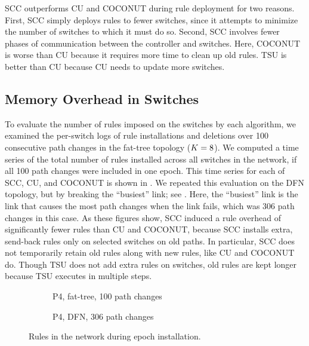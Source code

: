 SCC outperforms CU and COCONUT during rule deployment for two reasons.
First, SCC simply deploys rules to fewer switches, since it attempts
to minimize the number of switches to which it must do so.  Second,
SCC involves fewer phases of communication between the controller and
switches.  Here, COCONUT is worse than CU because it requires more
time to clean up old rules.  TSU is better than CU because CU needs to
update more switches.

\subsection{Memory Overhead in Switches}
\label{sec:eval:rules}

To evaluate the number of rules imposed on the switches by each
algorithm, we examined the per-switch logs of rule installations and
deletions over 100 consecutive path changes in the fat-tree topology
($K=8$).  We computed a time series of the total number
of rules installed across all switches in the network, if all 100 path
changes were included in one epoch.  This time series for each of SCC,
CU, and COCONUT is shown in .  We
repeated this evaluation on the DFN topology, but by breaking the
``busiest'' link; see .  Here, the
``busiest'' link is the link that causes the most path changes when
the link fails, which was 306 path changes in this case.  As these
figures show, SCC induced a rule overhead of significantly fewer rules
than CU and COCONUT, because SCC installs extra, send-back rules only
on selected switches on old paths.  In particular, SCC does not
temporarily retain old rules along with new rules, like CU and COCONUT
do.  Though TSU does not add extra rules on switches, old rules are
kept longer because TSU executes in multiple steps.


\begin{figure}[h]
\centering
  \begin{subfigure}[b]{0.49\linewidth}
    \resizebox{\linewidth}{!}{\footnotesize}
    \caption{P4, fat-tree, 100 path changes}
    \label{fig:rule_number:fat_tree}
  \end{subfigure}
  \begin{subfigure}[b]{0.49\linewidth}
    \resizebox{\linewidth}{!}{\footnotesize}
    \caption{P4, DFN, 306 path changes}
    \label{fig:rule_number:dfn}
  \end{subfigure}
\caption{Rules in the network during epoch installation.}
\label{fig:rule_number}
\end{figure}


